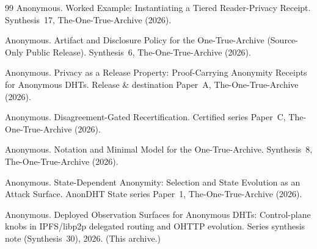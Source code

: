 \documentclass[11pt]{article}
\begin{document}
\begin{thebibliography}{99}
Anonymous.
\newblock Worked Example: Instantiating a Tiered Reader-Privacy Receipt.
\newblock Synthesis~17, The-One-True-Archive (2026).

Anonymous.
\newblock Artifact and Disclosure Policy for the One-True-Archive (Source-Only Public Release).
\newblock Synthesis~6, The-One-True-Archive (2026).

Anonymous.
\newblock Privacy as a Release Property: Proof-Carrying Anonymity Receipts for Anonymous DHTs.
\newblock Release \& destination Paper~A, The-One-True-Archive (2026).

Anonymous.
\newblock Disagreement-Gated Recertification.
\newblock Certified series Paper~C, The-One-True-Archive (2026).


Anonymous.
\newblock Notation and Minimal Model for the One-True-Archive.
\newblock Synthesis~8, The-One-True-Archive (2026).


Anonymous.
\newblock State-Dependent Anonymity: Selection and State Evolution as an Attack Surface.
\newblock AnonDHT State series Paper~1, The-One-True-Archive (2026).


Anonymous.
\newblock Deployed Observation Surfaces for Anonymous DHTs: Control-plane knobs in IPFS/libp2p delegated routing and OHTTP evolution.
\newblock Series synthesis note (Synthesis~30), 2026. (This archive.)

\end{thebibliography}
\end{document}

